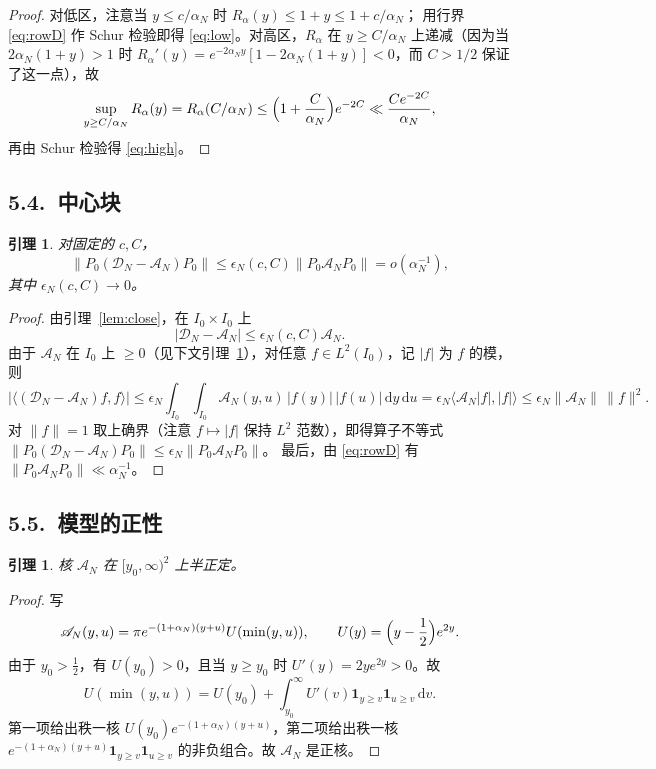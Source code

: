 \documentclass[12pt,a4paper]{amsart}
\numberwithin{equation}{section}
\theoremstyle{plain}
\newtheorem{lemma}[theorem]{引理}
\theoremstyle{definition}
\newcommand{\dd}{\,\mathrm{d}}
\begin{document}
\begin{proof}
对低区，注意当 $y\le c/\alpha_N$ 时 $R_\alpha(y)\le1+y\le1+c/\alpha_N$；
用行界 \eqref{eq:rowD} 作 Schur 检验即得 \eqref{eq:low}。对高区，$R_\alpha$ 在
$y\ge C/\alpha_N$ 上递减（因为当 $2\alpha_N(1+y)>1$ 时
$R_\alpha'(y)=e^{-2\alpha_Ny}[1-2\alpha_N(1+y)]<0$，而 $C>1/2$ 保证了这一点），故
\[
 \sup_{y\ge C/\alpha_N}R_\alpha(y)=R_\alpha(C/\alpha_N)
 \le\Bigl(1+\frac C{\alpha_N}\Bigr)e^{-2C}\ll\frac{Ce^{-2C}}{\alpha_N},
\]
再由 Schur 检验得 \eqref{eq:high}。
\end{proof}

\subsection*{5.4.\ 中心块}

\begin{lemma}\label{lem:center}
对固定的 $c,C$，
\begin{equation}\label{eq:center}
 \|P_0(\mathcal D_N-\mathscr A_N)P_0\|\le\epsilon_N(c,C)\|P_0\mathscr A_NP_0\|
 =o(\alpha_N^{-1}),
\end{equation}
其中 $\epsilon_N(c,C)\to0$。
\end{lemma}

\begin{proof}
由引理~\ref{lem:close}，在 $I_0\times I_0$ 上
\[
 |\mathscr D_N-\mathscr A_N|\le\epsilon_N(c,C)\mathscr A_N .
\]
由于 $\mathscr A_N$ 在 $I_0$ 上 $\ge0$（见下文引理~\ref{lem:positive}），对任意
$f\in L^2(I_0)$，记 $|f|$ 为 $f$ 的模，则
\[
 \bigl|\langle(\mathcal D_N-\mathscr A_N)f,f\rangle\bigr|
 \le\epsilon_N\int_{I_0}\!\int_{I_0}\mathscr A_N(y,u)\,|f(y)|\,|f(u)|\dd y\dd u
 =\epsilon_N\langle\mathscr A_N|f|,|f|\rangle
 \le\epsilon_N\|\mathscr A_N\|\,\|f\|^2 .
\]
对 $\|f\|=1$ 取上确界（注意 $f\mapsto|f|$ 保持 $L^2$ 范数），即得算子不等式
$\|P_0(\mathcal D_N-\mathscr A_N)P_0\|\le\epsilon_N\|P_0\mathscr A_NP_0\|$。
最后，由 \eqref{eq:rowD} 有 $\|P_0\mathscr A_NP_0\|\ll\alpha_N^{-1}$。
\end{proof}

\subsection*{5.5.\ 模型的正性}

\begin{lemma}\label{lem:positive}
核 $\mathscr A_N$ 在 $[y_0,\infty)^2$ 上半正定。
\end{lemma}

\begin{proof}
写
\[
 \mathscr A_N(y,u)=\pi e^{-(1+\alpha_N)(y+u)}U(\min(y,u)),
 \qquad U(y)=\Bigl(y-\frac12\Bigr)e^{2y}.
\]
由于 $y_0>\frac12$，有 $U(y_0)>0$，且当 $y\ge y_0$ 时 $U'(y)=2ye^{2y}>0$。故
\[
 U(\min(y,u))=U(y_0)+\int_{y_0}^{\infty}U'(v)\mathbf 1_{y\ge v}\mathbf 1_{u\ge v}\dd v .
\]
第一项给出秩一核 $U(y_0)e^{-(1+\alpha_N)(y+u)}$，第二项给出秩一核
$e^{-(1+\alpha_N)(y+u)}\mathbf 1_{y\ge v}\mathbf 1_{u\ge v}$ 的非负组合。故
$\mathscr A_N$ 是正核。
\end{proof}
\end{document}
